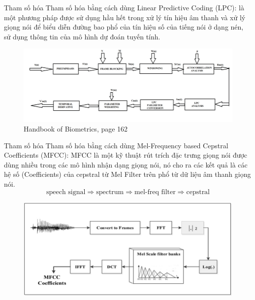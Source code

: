 \documentclass[notheorems, aspectratio=54]{beamer}
\begin{document}
\begin{frame}{Tham số hóa}
	Tham số hóa bằng cách dùng Linear Predictive Coding (LPC): là một phương pháp được sử dụng hầu hết trong xử lý tín hiệu âm thanh và xử lý giọng nói để biểu diễn đường bao phổ của tín hiệu số của tiếng nói ở dạng nén, sử dụng thông tin của mô hình dự đoán tuyến tính.
	\begin{figure}[h!]
		\includegraphics[width=0.9\linewidth]{images/Block-diagram-of-LPC-Linear-Predictive-Coding.png}
		\caption{Handbook of Biometrics, page 162}
		\label{fig:writing-thesis}
	\end{figure}
\end{frame}
\begin{frame}{Tham số hóa}
	Tham số hóa bằng cách dùng Mel-Frequency based Cepstral Coefficients (MFCC): MFCC là một kỹ thuật rút trích đặc trưng giọng nói được dùng nhiều trong các mô hình nhận dạng giọng nói, nó cho ra các kết quả là các hệ số (Coefficients) của cepstral từ Mel Filter trên phổ từ dữ liệu âm thanh giọng nói.
	 $$\text{speech signal} \Rightarrow \text{spectrum} \Rightarrow \text{mel-freq filter} \Rightarrow \text{cepstral}$$
	\begin{figure}[H]
		\includegraphics[width=0.75\linewidth]{images/Extraction-Mel-frequency-cepstral-coefficients-MFCC-from-the-audio-recording-signals.png}
		\label{fig:writing-thesis}
	\end{figure}
\end{frame}
\end{document}
